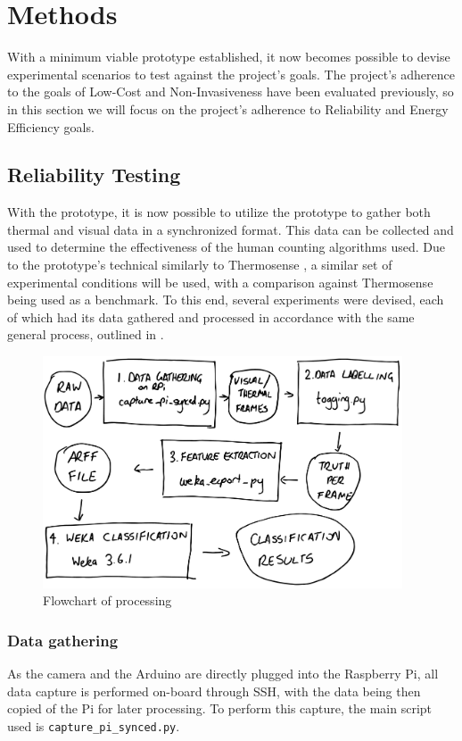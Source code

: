 \documentclass[../thesis/thesis.tex]{subfiles}
\begin{document}
 \chapter{Methods}
With a minimum viable prototype established, it now becomes possible to devise experimental scenarios to test against the project's goals. The project's adherence to the goals of Low-Cost and Non-Invasiveness have been evaluated previously, so in this section we will focus on the project's adherence to Reliability and Energy Efficiency goals.

\section{Reliability Testing}

With the prototype, it is now possible to utilize the prototype to gather both thermal and visual data in a synchronized format. This data can be collected and used to determine the effectiveness of the human counting algorithms used. Due to the prototype's technical similarly to Thermosense \cite{beltran2013thermosense}, a similar set of experimental conditions will be used, with a comparison against Thermosense being used as a benchmark. To this end, several experiments were devised, each of which had its data gathered and processed in accordance with the same general process, outlined in .

\begin{figure}
\centering
\includegraphics[width=0.95\textwidth]{../diagrams/temp/method-flowchart.pdf}
\caption{Flowchart of processing}
\label{fig:methods:flowchart}
\end{figure}

\subsection{Data gathering}
As the camera and the Arduino are directly plugged into the Raspberry Pi, all data capture is performed on-board through SSH, with the data being then copied of the Pi for later processing. To perform this capture, the main script used is \texttt{capture\_pi\_synced.py}.
\end{document}
